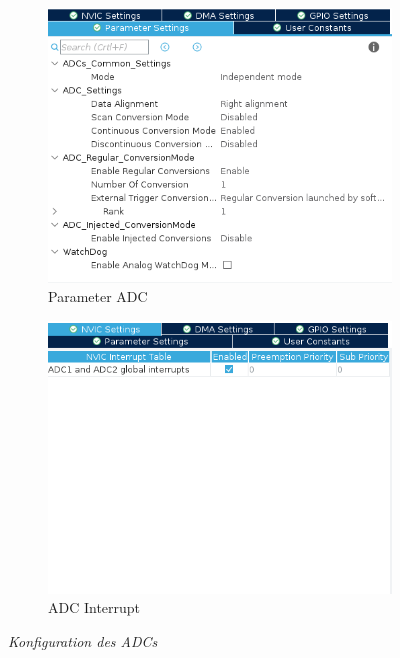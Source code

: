 \begin{figure}[h]
    \centering
    \begin{subfigure}{0.45\textwidth}
        \centering
        \includegraphics[width=\textwidth]{Pictures/adc_param.png}
        \caption{Parameter ADC}
        \label{img: Parameter ADC}
    \end{subfigure}
    \begin{subfigure}{0.45\textwidth}
        \centering
        \includegraphics[width=\textwidth]{Pictures/adc_nvic.png}
        \caption{ADC Interrupt}
        \label{img: ADC Interrupt}
    \end{subfigure}
    \caption{\textit{Konfiguration des \acp{ADC}}}
    \label{img: ADC config}
  \end{figure}

